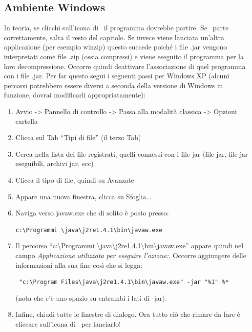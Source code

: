 \subsection{Ambiente Windows}
In teoria, se clicchi sull'icona di \xlogo\ il programma dovrebbe partire.
Se \xlogo\ parte correttamente, salta il resto del capitolo. Se invece viene lanciata un'altra applicazione (per esempio winzip) questo succede poiché i file .jar vengono interpretati come file .zip (ossia compressi) e viene eseguito il programma per la loro decompressione. Occorre quindi deattivare l'associazione di quel programma con i file .jar. Per far questo segui i seguenti passi per Windows XP (alcuni percorsi potrebbero essere diversi a seconda della versione di Windows in funzione, dovrai modificarli appropriatamente):

\begin{enumerate}
\item Avvio -> Pannello di controllo -> Passa alla modalità classica  -> Opzioni cartella
\item Clicca sul Tab ``Tipi di file'' (il terzo Tab)
\item Cerca nella lista dei file registrati, quelli connessi con i file jar (file jar, file jar eseguibili, archivi jar, ecc)
\item Clicca il tipo di file, quindi su Avanzate
\item Appare una nuova finestra, clicca su Sfoglia...
\item Naviga verso javaw.exe che di solito è posto presso:
\begin{center}
\texttt{c:\textbackslash{}Programmi \textbackslash{}java\textbackslash{}j2re1.4.1\textbackslash{}bin\textbackslash{}javaw.exe}
\end{center}
\item Il percorso {}``c:\textbackslash{}Programmi \textbackslash{}java\textbackslash{}j2re1.4.1\textbackslash{}bin\textbackslash{}javaw.exe'' appare quindi nel campo \textit{Applicazione utilizzata per eseguire l'azione:}. Occorre aggiungere delle informazioni alla sua fine così che si legga:
\begin{center}
\texttt{ "c:\textbackslash{}Program Files\textbackslash{}java\textbackslash{}j2re1.4.1\textbackslash{}bin\textbackslash{}javaw.exe" -jar {}"\%1" \%{*}}
\end{center}
(nota che c'è uno spazio su entrambi i lati di -jar).
\item Infine, chiudi tutte le finestre di dialogo. Ora tutto ciò che rimare da fare è cliccare sull'icona di \xlogo\ per lanciarlo!
\end{enumerate}
